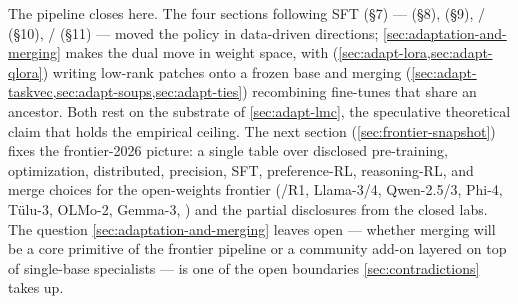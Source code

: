 The pipeline closes here. The four sections following SFT (\S7) ---
 (\S8),  (\S9), / (\S10), / (\S11) --- moved the
policy in data-driven directions; \cref{sec:adaptation-and-merging}
makes the dual move in weight space, with 
(\cref{sec:adapt-lora,sec:adapt-qlora}) writing low-rank patches onto a
frozen base and merging
(\cref{sec:adapt-taskvec,sec:adapt-soups,sec:adapt-ties}) recombining
fine-tunes that share an ancestor. Both rest on the  substrate of
\cref{sec:adapt-lmc}, the speculative theoretical claim that holds the
empirical ceiling. The next section
(\cref{sec:frontier-snapshot}) fixes
the frontier-2026 picture: a single table over disclosed pre-training,
optimization, distributed, precision, SFT, preference-RL,
reasoning-RL, and merge choices for the open-weights frontier
(/R1, Llama-3/4, Qwen-2.5/3, Phi-4, Tülu-3, OLMo-2, Gemma-3,
) and the partial disclosures from the closed labs. The
question \cref{sec:adaptation-and-merging} leaves open --- whether
merging will be a core primitive of the frontier pipeline or
a community add-on layered on top of single-base specialists --- is one
of the open boundaries \cref{sec:contradictions}
takes up.

